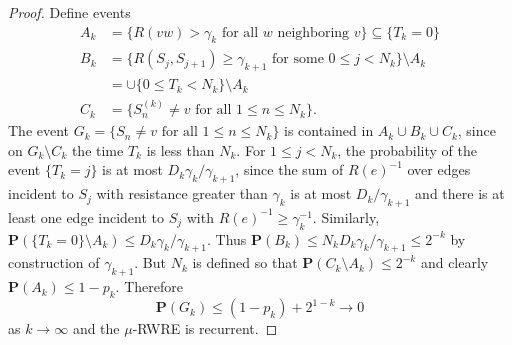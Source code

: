 \documentclass[11pt]{article}
\newcommand{\PP}{\mathbf P}
\begin{document}
\begin{proof}
Define events
\begin{align*}
A_k&=\{R(vw)>\gamma_k\text{ for all }w\text{ neighboring }v\}\subseteq\{T_k=0\}\\
B_k&=\{R(S_j,S_{j+1})\geq\gamma_{k+1}\text{ for some }0\leq j<N_k\}\setminus A_k\\
   &=\cup\{0\leq T_k<N_k\}\setminus A_k\\
C_k&=\{S_n^{(k)}\neq v\text{ for all }1\leq n\leq N_k\}.
\end{align*}
The event $G_k=\{S_n\neq v\text{ for all }1\leq n\leq N_k\}$ is contained
in $A_k\cup B_k\cup C_k$, since on $G_k\setminus C_k$ the time $T_k$ is
less than $N_k$. For $1\leq j<N_k$, the probability of the event
$\{T_k=j\}$ is at most $D_k\gamma_k/\gamma_{k+1}$, since the sum of
$R(e)^{-1}$ over edges incident to $S_j$ with resistance greater than
$\gamma_k$ is at most $D_k/\gamma_{k+1}$ and there is at least one edge
incident to $S_j$ with $R(e)^{-1}\geq\gamma_k^{-1}$.
Similarly, $\PP(\{T_k=0\}\setminus A_k)\leq D_k\gamma_k/\gamma_{k+1}$.
Thus $\PP(B_k)\leq N_kD_k\gamma_k/\gamma_{k+1}\leq2^{-k}$ by construction
of $\gamma_{k+1}$. But $N_k$ is defined so that
$\PP(C_k\setminus A_k)\leq2^{-k}$ and clearly $\PP(A_k)\leq1-p_k$.
Therefore
\[
\PP(G_k)\leq(1-p_k)+2^{1-k}\longrightarrow0
\]
as $k\to\infty$ and the $\mu$-RWRE is recurrent.
\end{proof}
\end{document}
